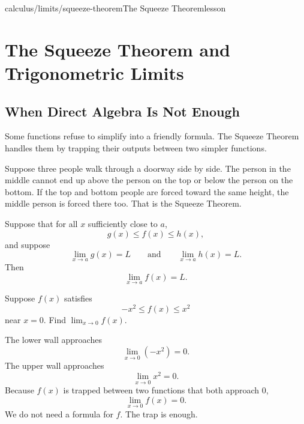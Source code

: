 \begin{webpage}{calculus/limits/squeeze-theorem}{The Squeeze Theorem}{lesson}
\chapter{The Squeeze Theorem and Trigonometric Limits}

\section{When Direct Algebra Is Not Enough}


Some functions refuse to simplify into a friendly formula. The Squeeze Theorem handles them by trapping their outputs between two simpler functions.

\begin{bgconcept}
Suppose three people walk through a doorway side by side. The person in the middle cannot end up above the person on the top or below the person on the bottom. If the top and bottom people are forced toward the same height, the middle person is forced there too. That is the Squeeze Theorem.
\end{bgconcept}

\begin{bgtheorem}[title={Squeeze Theorem}]
Suppose that for all \(x\) sufficiently close to \(a\),
\[
  g(x)\le f(x)\le h(x),
\]
and suppose
\[
  \lim_{x\to a}g(x)=L
  \qquad\text{and}\qquad
  \lim_{x\to a}h(x)=L.
\]
Then
\[
  \boxed{\lim_{x\to a}f(x)=L}.
\]
\end{bgtheorem}

\begin{bgguided}[title={A number trapped between shrinking walls}]
Suppose \(f(x)\) satisfies
\[
  -x^2\le f(x)\le x^2
\]
near \(x=0\). Find \(\lim_{x\to0}f(x)\).

\begin{bgsolution}
The lower wall approaches
\[
  \lim_{x\to0}(-x^2)=0.
\]
The upper wall approaches
\[
  \lim_{x\to0}x^2=0.
\]
Because \(f(x)\) is trapped between two functions that both approach \(0\),
\[
  \boxed{\lim_{x\to0}f(x)=0}.
\]
We do not need a formula for \(f\). The trap is enough.
\end{bgsolution}
\end{bgguided}




\end{webpage}
